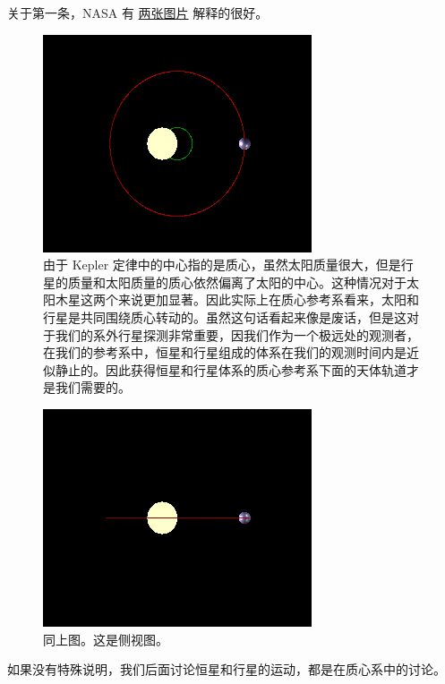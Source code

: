 \documentclass[letterpaper,10pt,english]{sphinxmanual}
\begin{document}
关于第一条，NASA 有 \href{http://spaceplace.nasa.gov/barycenter/en/}{两张图片} 解释的很好。
\begin{figure}[htbp]
\centering
\capstart

\includegraphics{doppspec-above.gif}
\caption{由于 Kepler 定律中的中心指的是质心，虽然太阳质量很大，但是行星的质量和太阳质量的质心依然偏离了太阳的中心。这种情况对于太阳木星这两个来说更加显著。因此实际上在质心参考系看来，太阳和行星是共同围绕质心转动的。虽然这句话看起来像是废话，但是这对于我们的系外行星探测非常重要，因我们作为一个极远处的观测者，在我们的参考系中，恒星和行星组成的体系在我们的观测时间内是近似静止的。因此获得恒星和行星体系的质心参考系下面的天体轨道才是我们需要的。}\end{figure}
\begin{figure}[htbp]
\centering
\capstart

\includegraphics{dopspec-inline.gif}
\caption{同上图。这是侧视图。}\end{figure}

如果没有特殊说明，我们后面讨论恒星和行星的运动，都是在质心系中的讨论。
\end{document}
